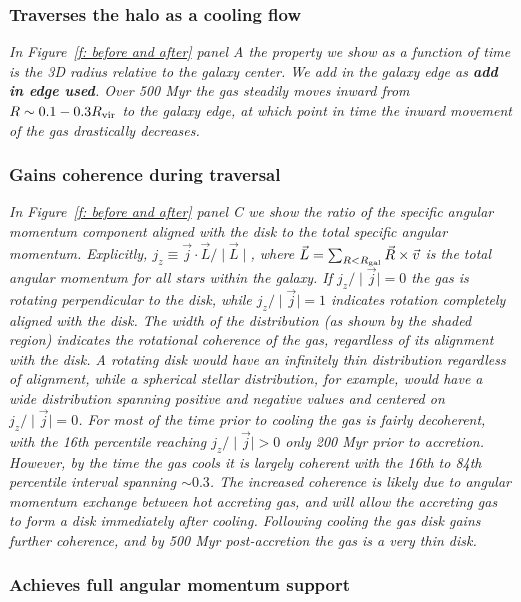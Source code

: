 \documentclass[fleqn,usenatbib]{mnras}
\begin{document}
\subsubsection{Traverses the halo as a cooling flow}

\textit{
In Figure~\ref{f: before and after} panel A the property we show as a function of time is the 3D radius relative to the galaxy center.
We add in the galaxy edge as \textbf{add in edge used}.
Over 500 Myr the gas steadily moves inward from $ R\sim 0.1 - 0.3 R_{\rm vir}$ to the galaxy edge, at which point in time the inward movement of the gas drastically decreases.
}

\subsubsection{Gains coherence during traversal}

\textit{
In Figure~\ref{f: before and after} panel C we show the ratio of the specific angular momentum component aligned with the disk to the total specific angular momentum.
Explicitly, $j_z \equiv \vec j \cdot \vec L / \mid \vec L \mid $, where $\vec L = \sum_{R < R_{\rm gal}} \vec R \times \vec v$ is the total angular momentum for all stars within the galaxy.
If $j_z/\mid \vec j \mid=0$ the gas is rotating perpendicular to the disk, while $j_z/\mid \vec j \mid=1$  indicates rotation completely aligned with the disk.
The width of the distribution (as shown by the shaded region) indicates the rotational coherence of the gas, regardless of its alignment with the disk.
A rotating disk would have an infinitely thin distribution regardless of alignment, while a spherical stellar distribution, for example, would have a wide distribution spanning positive and negative values and centered on  $j_z/\mid \vec j \mid=0$.
For most of the time prior to cooling the gas is fairly decoherent, with the 16th percentile reaching  $j_z/\mid \vec j \mid > 0$  only 200 Myr prior to accretion.
However, by the time the gas cools it is largely coherent with the 16th to 84th percentile interval spanning $\sim 0.3$.
The increased coherence is likely due to angular momentum exchange between hot accreting gas, and will allow the accreting gas to form a disk immediately after cooling.
Following cooling the gas disk gains further coherence, and by 500 Myr post-accretion the gas is a very thin disk.
}

\subsubsection{Achieves full angular momentum support}
\end{document}
